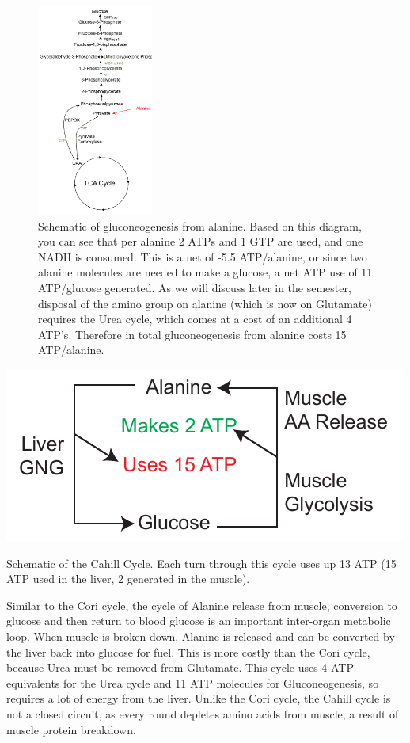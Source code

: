 \documentclass{tufte-handout}
\begin{document}
\begin{figure}
\begin{center}
\includegraphics[width=1.5in]{figures/gluconeogenic-substrates-alanine.pdf}
\caption{Schematic of gluconeogenesis from alanine.  Based on this diagram, you can see that per alanine 2 ATPs and 1 GTP are used, and one NADH is consumed.  This is a net of -5.5 ATP/alanine, or since two alanine molecules are needed to make a glucose, a net ATP use of 11 ATP/glucose generated.  As we will discuss later in the semester, disposal of the amino group on alanine (which is now on Glutamate) requires the Urea cycle, which comes at a cost of an additional 4 ATP's.  Therefore in total gluconeogenesis from alanine costs 15 ATP/alanine.}
\label{fig:gluconeogenic-substrates-alanine}
\end{center}
\end{figure}

\begin{marginfigure}
\includegraphics{figures/cahill-cycle.pdf}
\caption{Schematic of the Cahill Cycle.  Each turn through this cycle uses up 13 ATP (15 ATP used in the liver, 2 generated in the muscle).}
\label{fig:cahill-cycle}
\end{marginfigure}

  Similar to the Cori cycle, the cycle of Alanine release from muscle, conversion to glucose and then return to blood glucose is an important inter-organ metabolic loop.  When muscle is broken down, Alanine is released and can be converted by the liver back into glucose for fuel.  This is more costly than the Cori cycle, because Urea must be removed from Glutamate.  This cycle uses 4 ATP equivalents for the Urea cycle and 11 ATP molecules for Gluconeogenesis, so requires a lot of energy from the liver.  Unlike the Cori cycle, the Cahill cycle is not a closed circuit, as every round depletes amino acids from muscle, a result of muscle protein breakdown.
\end{document}
